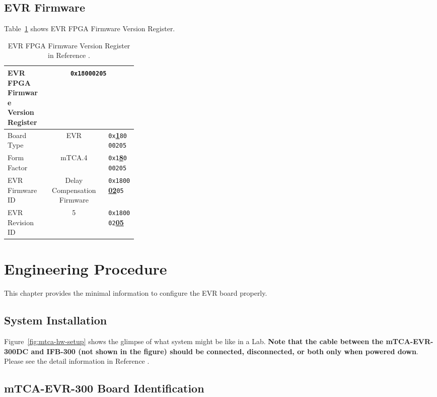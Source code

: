 \documentclass[11pt
  , a4paper
  , article
  , oneside
  , showtrims
]{memoir}
\begin{document}
\section{EVR Firmware}
Table~\ref{table:fwinfo} shows EVR FPGA Firmware Version Register.

\begin{table}[!htb]
  \centering
  \begin{tabular}{p{0.3\linewidth}|c|l}
    \toprule
    EVR FPGA Firmware Version Register            & \multicolumn{2}{c}{\texttt{0x18000205}}             \\\midrule
    Board Type      & EVR                         &  \texttt{0x}\underline{\textbf{1}}\texttt{8000205}  \\\midrule
    Form Factor     & mTCA.4                      &  \texttt{0x1}\underline{\textbf{8}}\texttt{000205}  \\\midrule
    EVR Firmware ID & Delay Compensation Firmware &  \texttt{0x1800}\underline{\textbf{02}}\texttt{05}  \\\midrule
    EVR Revision ID & 5                           &  \texttt{0x180002}\underline{\textbf{05}}           \\\bottomrule
  \end{tabular}
  \caption[]{EVR FPGA Firmware Version Register in Reference \citep[see][p66]{MRFEVENTSYSTEMDC}.}
  \label{table:fwinfo}
\end{table}


\clearpage
\chapter{Engineering Procedure}
This chapter provides the minimal information to configure the EVR board properly. 

\section{System Installation}
Figure~\ref{fig:mtca-hw-setup} shows the glimpse of what system might be like in a Lab. \textbf{Note that the cable between the mTCA-EVR-300DC and IFB-300 (not shown in the figure) should be connected, disconnected, or both only when powered down}. Please see the detail information in Reference \citep[][p54]{MRFEVENTSYSTEMDC}.
  
\section{mTCA-EVR-300 Board Identification}
         
\end{document}
